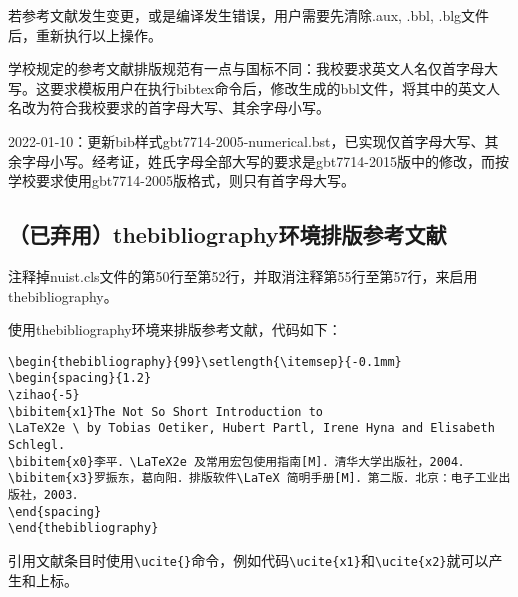 若参考文献发生变更，或是编译发生错误，用户需要先清除.aux, .bbl, .blg文件后，重新执行以上操作。

学校规定的参考文献排版规范有一点与国标不同：我校要求英文人名仅首字母大写。这要求模板用户在执行bibtex命令后，修改生成的bbl文件，将其中的英文人名改为符合我校要求的首字母大写、其余字母小写。

{\color{blue}
2022-01-10：更新bib样式gbt7714-2005-numerical.bst，已实现仅首字母大写、其余字母小写。经考证，姓氏字母全部大写的要求是gbt7714-2015版中的修改，而按学校要求使用gbt7714-2005版格式，则只有首字母大写。\cite{陈浩元2015GB}}

\subsection{（已弃用）thebibliography环境排版参考文献}
注释掉nuist.cls文件的第50行至第52行，并取消注释第55行至第57行，来启用thebibliography。

使用thebibliography环境来排版参考文献，代码如下：
{\color{green!50!black}
\begin{lstlisting}[breaklines=true,]
\begin{thebibliography}{99}\setlength{\itemsep}{-0.1mm}
\begin{spacing}{1.2}
\zihao{-5}
\bibitem{x1}The Not So Short Introduction to 
\LaTeX2e \ by Tobias Oetiker, Hubert Partl, Irene Hyna and Elisabeth Schlegl.
\bibitem{x0}李平．\LaTeX2e 及常用宏包使用指南[M]．清华大学出版社，2004．
\bibitem{x3}罗振东，葛向阳．排版软件\LaTeX 简明手册[M]．第二版．北京：电子工业出版社，2003．
\end{spacing}
\end{thebibliography}
\end{lstlisting}
}
引用文献条目时使用\verb|\ucite{}|命令，例如代码\verb|\ucite{x1}|和\verb|\ucite{x2}|就可以产生\cite{x1}和\cite{x2}上标。